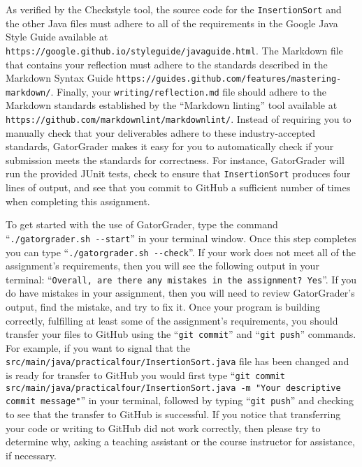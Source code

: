 \documentclass[11pt]{article}
\newcommand{\mainprogram}{\lstinline{InsertionSort}}
\newcommand{\mainprogramsource}{\lstinline{src/main/java/practicalfour/InsertionSort.java}}
\newcommand{\mainprogramoutput}{four}
\newcommand{\reflection}{\lstinline{writing/reflection.md}}
\newcommand{\gatorgraderstart}{\command{./gatorgrader.sh --start}}
\newcommand{\gatorgradercheck}{\command{./gatorgrader.sh --check}}
\newcommand{\gitcommit}{\command{git commit}}
\newcommand{\gitpush}{\command{git push}}
\newcommand{\gitcommitmainprogram}{\command{git commit src/main/java/practicalfour/InsertionSort.java -m "Your
descriptive commit message"}}
\newcommand{\command}[1]{``\lstinline{#1}''}
\newcommand{\url}[1]{\lstinline{#1}}
\newcommand{\step}[1]{``{#1}''}
\begin{document}
As verified by the Checkstyle tool, the source code for the \mainprogram{} and
the other Java files must adhere to all of the requirements in the Google Java
Style Guide available at
\url{https://google.github.io/styleguide/javaguide.html}. The Markdown file that
contains your reflection must adhere to the standards described in the Markdown
Syntax Guide \url{https://guides.github.com/features/mastering-markdown/}.
Finally, your \reflection{} file should adhere to the Markdown standards
established by the \step{Markdown linting} tool available at
\url{https://github.com/markdownlint/markdownlint/}. Instead of requiring you to
manually check that your deliverables adhere to these industry-accepted
standards, GatorGrader makes it easy for you to automatically check if your
submission meets the standards for correctness. For instance, GatorGrader will
run the provided JUnit tests, check to ensure that \mainprogram{} produces
\mainprogramoutput{} lines of output, and see that you commit to GitHub a
sufficient number of times when completing this assignment.

To get started with the use of GatorGrader, type the command \gatorgraderstart{} in your terminal window. Once this step
completes you can type \gatorgradercheck{}. If your work does not meet all of the assignment's requirements, then you
will see the following output in your terminal: \command{Overall, are there any mistakes in the assignment? Yes}. If you
do have mistakes in your assignment, then you will need to review GatorGrader's output, find the mistake, and try to fix
it. Once your program is building correctly, fulfilling at least some of the assignment's requirements, you should
transfer your files to GitHub using the \gitcommit{} and \gitpush{} commands. For example, if you want to signal that
the \mainprogramsource{} file has been changed and is ready for transfer to GitHub you would first type
\gitcommitmainprogram{} in your terminal, followed by typing \gitpush{} and checking to see that the transfer to GitHub
is successful. If you notice that transferring your code or writing to GitHub did not work correctly, then please try to
determine why, asking a teaching assistant or the course instructor for assistance, if necessary.
\end{document}
